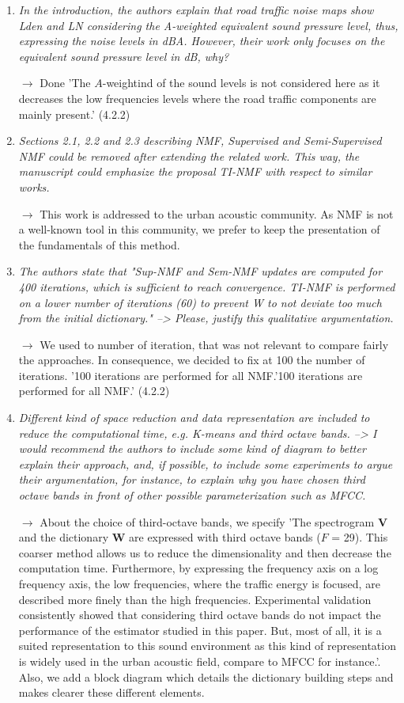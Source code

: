 \documentclass[10pt]{article}
\begin{document}
\begin{enumerate}
\item \emph{In the introduction, the authors explain that road traffic noise maps show Lden and LN considering the A-weighted equivalent sound pressure level, thus, expressing the noise levels in dBA. However, their work only focuses on the equivalent sound pressure level in dB, why? }

$\rightarrow$ Done 'The $A$-weightind of the sound levels is not considered here as it decreases the low frequencies levels where the road traffic components are mainly present.' (4.2.2)

\item \emph{Sections 2.1, 2.2 and 2.3 describing NMF, Supervised and Semi-Supervised NMF could be removed after extending the related work. This way, the manuscript could emphasize the proposal TI-NMF with respect to similar works.}

$\rightarrow$ This work is addressed to the urban acoustic community. As NMF is not a well-known tool in this community, we prefer to keep the presentation of the fundamentals of this method.

\item \emph{The authors state that "Sup-NMF and Sem-NMF updates are computed for 400 iterations, which is sufficient to reach convergence. TI-NMF is performed on a lower number of iterations (60) to prevent W to not deviate too much from the initial dictionary." --> Please, justify this qualitative argumentation.}

$\rightarrow$ We used to number of iteration, that was not relevant to compare fairly the approaches. In consequence, we decided to fix at 100 the number of iterations. '100 iterations are performed for all NMF.'100 iterations are performed for all NMF.' (4.2.2)

\item \emph{Different kind of space reduction and data representation are included to reduce the computational time, e.g. K-means and third octave bands. --> I would recommend the authors to include some kind of diagram to better explain their approach, and, if possible, to include some experiments to argue their argumentation, for instance, to explain why you have chosen third octave bands in front of other possible parameterization such as MFCC.}

$\rightarrow$ About the choice of third-octave bands, we specify 'The spectrogram $\mathbf{V}$ and the dictionary $\mathbf{W}$ are expressed with third octave bands ($F$ = 29). This coarser method allows us to reduce the dimensionality and then decrease the computation time. Furthermore, by expressing the frequency axis on a log frequency axis, the low frequencies, where the traffic energy is focused, are described more finely than the high frequencies. Experimental validation consistently showed that considering third octave bands do not impact the performance of the estimator studied in this paper. But, most of all, it is a suited representation to this sound environment as this kind of representation is widely used in the urban acoustic field, compare to MFCC for instance.'. Also, we add a block diagram which details the dictionary building steps and makes clearer these different elements.


\end{enumerate}
\end{document}
